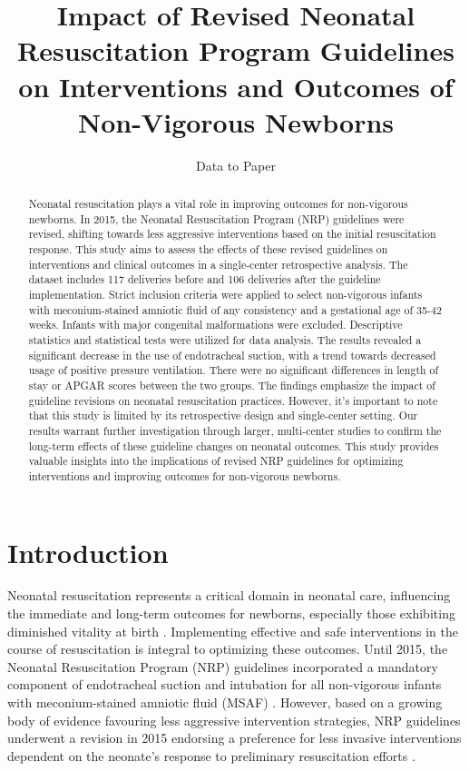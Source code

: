 \documentclass[11pt]{article}
\title{Impact of Revised Neonatal Resuscitation Program Guidelines on Interventions and Outcomes of Non-Vigorous Newborns}
\author{Data to Paper}
\begin{document}
\maketitle
\begin{abstract}Neonatal resuscitation plays a vital role in improving outcomes for non-vigorous newborns. In 2015, the Neonatal Resuscitation Program (NRP) guidelines were revised, shifting towards less aggressive interventions based on the initial resuscitation response. This study aims to assess the effects of these revised guidelines on interventions and clinical outcomes in a single-center retrospective analysis. The dataset includes 117 deliveries before and 106 deliveries after the guideline implementation. Strict inclusion criteria were applied to select non-vigorous infants with meconium-stained amniotic fluid of any consistency and a gestational age of 35-42 weeks. Infants with major congenital malformations were excluded. Descriptive statistics and statistical tests were utilized for data analysis. The results revealed a significant decrease in the use of endotracheal suction, with a trend towards decreased usage of positive pressure ventilation. There were no significant differences in length of stay or APGAR scores between the two groups. The findings emphasize the impact of guideline revisions on neonatal resuscitation practices. However, it's important to note that this study is limited by its retrospective design and single-center setting. Our results warrant further investigation through larger, multi-center studies to confirm the long-term effects of these guideline changes on neonatal outcomes. This study provides valuable insights into the implications of revised NRP guidelines for optimizing interventions and improving outcomes for non-vigorous newborns.\end{abstract}
\section*{Introduction}

Neonatal resuscitation represents a critical domain in neonatal care, influencing the immediate and long-term outcomes for newborns, especially those exhibiting diminished vitality at birth \cite{Carbine2000VideoRA, Grossman2017AnIT}. Implementing effective and safe interventions in the course of resuscitation is integral to optimizing these outcomes. Until 2015, the Neonatal Resuscitation Program (NRP) guidelines incorporated a mandatory component of endotracheal suction and intubation for all non-vigorous infants with meconium-stained amniotic fluid (MSAF) \cite{Bhutta2005CommunityBasedIF, Stock2012OutcomesOE}. However, based on a growing body of evidence favouring less aggressive intervention strategies, NRP guidelines underwent a revision in 2015 endorsing a preference for less invasive interventions dependent on the neonate's response to preliminary resuscitation efforts \cite{Chandrasekharan2020NeonatalRA, Hutton2015OutcomesAW}.
\end{document}
